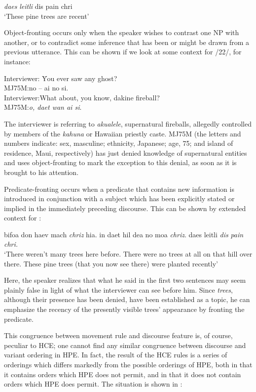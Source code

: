 \ea\label{ex:24}
 \textit{daes} \textit{leitli} dis pain chri\\
\glt   `These pine trees are recent'
\z

Object-fronting occurs only when the speaker wishes to contrast one NP with another, or to contradict some inference that has been or might be drawn from a previous utterance. This can be shown if we look at some context for /22/, for instance:

\ea\label{ex:25}
\begin{tabbing}
Interviewer: \= You ever saw any ghost?\\
MJ75M:\>no -- ai no si.\\
Interviewer:\>What about, you know, dakine fireball?\\
MJ75M:\>\textit{o, daet wan ai si}.
\end{tabbing}
\z

\noindent The interviewer is referring to \textit{akualele}, supernatural fireballs, allegedly controlled by members of the \textit{kahuna} or Hawaiian priestly caste. MJ75M (the letters and numbers indicate: sex, masculine; ethnicity, Japanese; age, 75; and island of residence, Maui, respectively) has just denied knowledge of supernatural entities and uses object-fronting to mark the exception to this denial, as soon as it is brought to his attention.

Predicate-fronting occurs when a predicate that contains new information is introduced in conjunction with a subject which has been explicitly stated or implied in the immediately preceding discourse. This can be shown by extended context for :

\ea\label{ex:26}
 bifoa don haev mach \textit{chriz} hia. in daet hil dea no moa \textit{chriz}. daes leitli \textit{dis} \textit{pain} \textit{chri.} \\
\glt  `There weren't many trees here before. There were no trees
at all on that hill over there. These pine trees (that you now see there) were planted recently'
\z

\noindent Here, the speaker realizes that what he said in the first two sentences may seem plainly false in light of what the interviewer can see before him. Since \textit{trees}, although their presence has been denied, have been established as a topic, he can emphasize the recency of the presently visible trees' appearance by fronting the predicate.

This congruence between movement rule and discourse feature is, of course, peculiar to HCE; one cannot find any similar congruence between discourse and variant ordering in HPE. In fact, the result of the HCE rules is a series of orderings which differs markedly from the possible orderings of HPE, both in that it contains orders which HPE does not permit, and in that it does not contain orders which HPE does permit. The situation is shown in :


